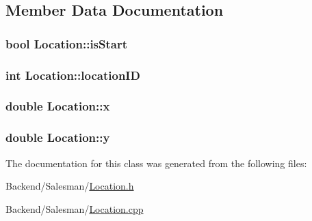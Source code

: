 \subsection{Member Data Documentation}
\hypertarget{classLocation_a43b3f7f0d4884faec745edf2ccba621f}{
\subsubsection[{is\-Start}]{\setlength{\rightskip}{0pt plus 5cm}bool Location\-::is\-Start}}\label{classLocation_a43b3f7f0d4884faec745edf2ccba621f}
\hypertarget{classLocation_a6be537a226b6add3dac2c3f9f87cdbb9}{
\subsubsection[{location\-I\-D}]{\setlength{\rightskip}{0pt plus 5cm}int Location\-::location\-I\-D}}\label{classLocation_a6be537a226b6add3dac2c3f9f87cdbb9}
\hypertarget{classLocation_ac794205a47bb99febce79b4c6d614ec1}{
\subsubsection[{x}]{\setlength{\rightskip}{0pt plus 5cm}double Location\-::x}}\label{classLocation_ac794205a47bb99febce79b4c6d614ec1}
\hypertarget{classLocation_a7981376ddbae36481fe6058146e1a130}{
\subsubsection[{y}]{\setlength{\rightskip}{0pt plus 5cm}double Location\-::y}}\label{classLocation_a7981376ddbae36481fe6058146e1a130}


The documentation for this class was generated from the following files\-:\begin{DoxyCompactItemize}
\item 
Backend/\-Salesman/\hyperlink{Location_8h}{Location.\-h}\item 
Backend/\-Salesman/\hyperlink{Location_8cpp}{Location.\-cpp}\end{DoxyCompactItemize}
